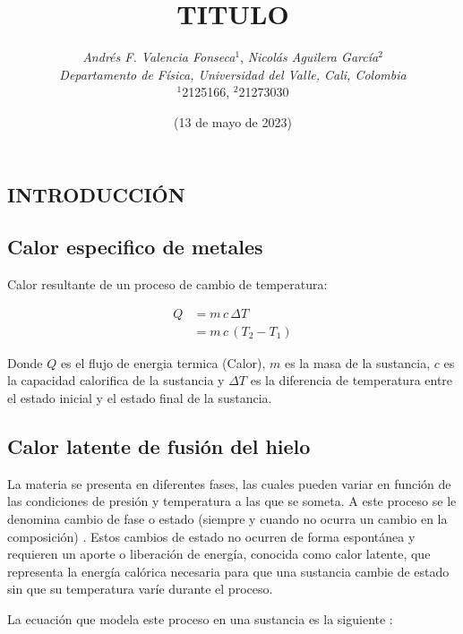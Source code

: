 \documentclass[10pt]{article}
\title{
    \textbf TITULO
}
\author{
    \normalsize{
        \emph{Andrés F. Valencia Fonseca}$^{1}$,
        \emph{Nicolás Aguilera García}$^{2}$
    } \\
    \normalsize{
        \emph{Departamento de Física, Universidad del Valle, Cali, Colombia}
    } \\
    \small{$^{1}$2125166, $^{2}$21273030}
}
\date{(\small 13 de mayo de 2023)}
\begin{document}
\maketitle
\begin{abstract}

\end{abstract}

\begin{multicols*}{2}
    \section{\small INTRODUCCIÓN}
    \subsection*{\small Calor especifico de metales}
        Calor resultante de un proceso de cambio de temperatura: %

        \begin{equation}
            \begin{split}
                Q &= m \, c \, \Delta T \\
                &= m \, c \, (T_2 - T_1)
            \end{split}
            \label{eq:flujo_calor}
        \end{equation}

        Donde $Q$ es el flujo de energia termica (Calor), $m$ es la masa de la sustancia, $c$ es la capacidad calorifica de la sustancia y $\Delta T$ es la diferencia de temperatura entre el estado inicial y el estado final de la sustancia.


    \subsection*{\small Calor latente de fusión del hielo}
        La materia se presenta en diferentes fases, las cuales pueden variar en función de las condiciones de presión y temperatura a las que se someta. A este proceso se le denomina cambio de fase o estado (siempre y cuando no ocurra un cambio en la composición) \cite{calorLatente}. Estos cambios de estado no ocurren de forma espontánea y requieren un aporte o liberación de energía, conocida como calor latente, que representa la energía calórica necesaria para que una sustancia cambie de estado sin que su temperatura varíe durante el proceso.

        La ecuación que modela este proceso en una sustancia es la siguiente \cite{calorLatente}:


\end{multicols*}
\end{document}

